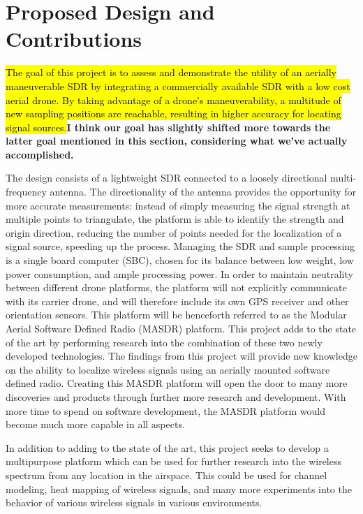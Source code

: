 \section{Proposed Design and Contributions}
\hl{The goal of this project is to assess and demonstrate the utility of an aerially maneuverable SDR by integrating a commercially available SDR with a low cost aerial drone. By taking advantage of a drone's maneuverability, a multitude of new sampling positions are reachable, resulting in higher accuracy for locating signal sources.}\textbf{I think our goal has slightly shifted more towards the latter goal mentioned in this section, considering what we've actually accomplished.} \par
The design consists of a lightweight SDR connected to a loosely directional multi-frequency antenna. The directionality of the antenna provides the opportunity for more accurate measurements: instead of simply measuring the signal strength at multiple points to triangulate, the platform is able to identify the strength and origin direction, reducing the number of points needed for the localization of a signal source, speeding up the process. Managing the SDR and sample processing is a single board computer (SBC), chosen for its balance between low weight, low power consumption, and ample processing power. In order to maintain neutrality between different drone platforms, the platform will not explicitly communicate with its carrier drone, and will therefore include its own GPS receiver and other orientation sensors. This platform will be henceforth referred to as the Modular Aerial Software Defined Radio (MASDR) platform. This project adds to the state of the art by performing research into the combination of these two newly developed technologies. The findings from this project will provide new knowledge on the ability to localize wireless signals using an aerially mounted software defined radio. Creating this MASDR platform will open the door to many more discoveries and products through further more research and development. With more time to spend on software development, the MASDR platform would become much more capable in all aspects.\par
In addition to adding to the state of the art, this project seeks to develop a multipurpose platform which can be used for further research into the wireless spectrum from any location in the airspace. This could be used for channel modeling, heat mapping of wireless signals, and many more experiments into the behavior of various wireless signals in various environments.\par
